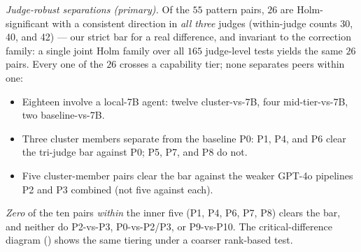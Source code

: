 \documentclass[11pt]{article}
\begin{document}
\emph{Judge-robust separations (primary).} Of the $55$ pattern pairs, $26$ are
Holm-significant with a consistent direction in \emph{all three} judges (within-judge
counts 30, 40, and 42) --- our strict bar for a real difference, and invariant to the
correction family: a single joint Holm family over all $165$ judge-level tests yields the
same $26$ pairs. Every one of the $26$ crosses a capability tier; none separates peers
within one:
\begin{itemize}
\item Eighteen involve a local-7B agent: twelve cluster-vs-7B, four mid-tier-vs-7B, two
baseline-vs-7B.
\item Three cluster members separate from the baseline P0: P1, P4, and P6 clear the
tri-judge bar against P0; P5, P7, and P8 do not.
\item Five cluster-member pairs clear the bar against the weaker GPT-4o pipelines P2 and P3
combined (not five against each).
\end{itemize}
\emph{Zero} of the ten pairs \emph{within} the inner five (P1, P4, P6, P7, P8) clears the
bar, and neither do P2-vs-P3, P0-vs-P2/P3, or P9-vs-P10. The critical-difference diagram
() shows the same tiering under a coarser rank-based test.
\end{document}
